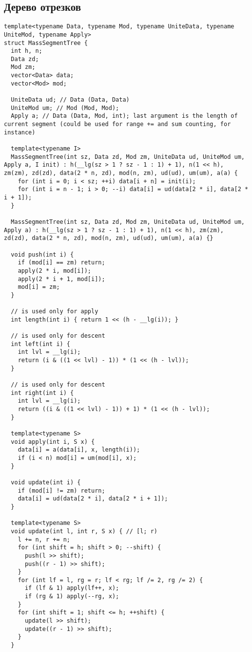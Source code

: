 \subsection{Дерево отрезков}
\begin{lstlisting}
template<typename Data, typename Mod, typename UniteData, typename UniteMod, typename Apply>
struct MassSegmentTree {
  int h, n;
  Data zd;
  Mod zm;
  vector<Data> data;
  vector<Mod> mod;

  UniteData ud; // Data (Data, Data)
  UniteMod um; // Mod (Mod, Mod);
  Apply a; // Data (Data, Mod, int); last argument is the length of current segment (could be used for range += and sum counting, for instance)

  template<typename I>
  MassSegmentTree(int sz, Data zd, Mod zm, UniteData ud, UniteMod um, Apply a, I init) : h(__lg(sz > 1 ? sz - 1 : 1) + 1), n(1 << h), zm(zm), zd(zd), data(2 * n, zd), mod(n, zm), ud(ud), um(um), a(a) {
    for (int i = 0; i < sz; ++i) data[i + n] = init(i);
    for (int i = n - 1; i > 0; --i) data[i] = ud(data[2 * i], data[2 * i + 1]);
  }

  MassSegmentTree(int sz, Data zd, Mod zm, UniteData ud, UniteMod um, Apply a) : h(__lg(sz > 1 ? sz - 1 : 1) + 1), n(1 << h), zm(zm), zd(zd), data(2 * n, zd), mod(n, zm), ud(ud), um(um), a(a) {}

  void push(int i) {
    if (mod[i] == zm) return;
    apply(2 * i, mod[i]);
    apply(2 * i + 1, mod[i]);
    mod[i] = zm;
  }

  // is used only for apply
  int length(int i) { return 1 << (h - __lg(i)); }

  // is used only for descent
  int left(int i) {
    int lvl = __lg(i);
    return (i & ((1 << lvl) - 1)) * (1 << (h - lvl));
  }

  // is used only for descent
  int right(int i) {
    int lvl = __lg(i);
    return ((i & ((1 << lvl) - 1)) + 1) * (1 << (h - lvl));
  }

  template<typename S>
  void apply(int i, S x) {
    data[i] = a(data[i], x, length(i));
    if (i < n) mod[i] = um(mod[i], x);
  }

  void update(int i) {
    if (mod[i] != zm) return;
    data[i] = ud(data[2 * i], data[2 * i + 1]);
  }

  template<typename S>
  void update(int l, int r, S x) { // [l; r)
    l += n, r += n;
    for (int shift = h; shift > 0; --shift) {
      push(l >> shift);
      push((r - 1) >> shift);
    }
    for (int lf = l, rg = r; lf < rg; lf /= 2, rg /= 2) {
      if (lf & 1) apply(lf++, x);
      if (rg & 1) apply(--rg, x);
    }
    for (int shift = 1; shift <= h; ++shift) {
      update(l >> shift);
      update((r - 1) >> shift);
    }
  }


\end{lstlisting}
